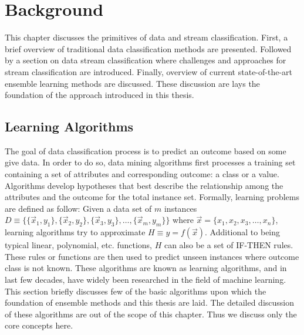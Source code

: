 \chapter{Background}
\label{chp:background}
This chapter discusses the primitives of data and stream classification. First, a brief overview of traditional data classification methods are presented. Followed by a section on data stream classification where challenges and approaches for stream classification are introduced. Finally, overview of current state-of-the-art ensemble learning methods are discussed. These discussion are lays the foundation of the approach introduced in this thesis.

\section{Learning Algorithms}
\label{sec:bg:learningalgos}
The goal of data classification process is to predict an outcome based on some give data. In order to do so, data mining algorithms first processes a training set containing a set of attributes and corresponding outcome: a class or a value. Algorithms develop hypotheses that best describe the relationship among the attributes and the outcome for the total instance set.  Formally, learning problems are defined as follow: Given a data set of $m$ instances  $D \equiv \{ \{\vec{x}_1, y_1\}, \{\vec{x}_2, y_2\}, \{\vec{x}_3, y_3\}, \dots, \{\vec{x}_m, y_m\} \}$ where $ \vec{x} = \{x_1, x_2, x_3, \dots, x_n\}$, learning algorithms try to approximate $H \equiv y = f(\vec{x})$. Additional to being typical linear, polynomial, etc. functions, $H$ can also be a set of IF-THEN rules. These rules or functions are then used to predict unseen instances where outcome class is not known. These algorithms are known as learning algorithms, and in last few decades, have widely been researched in the field of machine learning. This section briefly discusses few of the basic algorithms upon which the foundation of ensemble methods and this thesis are laid. The detailed discussion of these algorithms are out of the scope of this chapter. Thus we discuss only the core concepts here.


